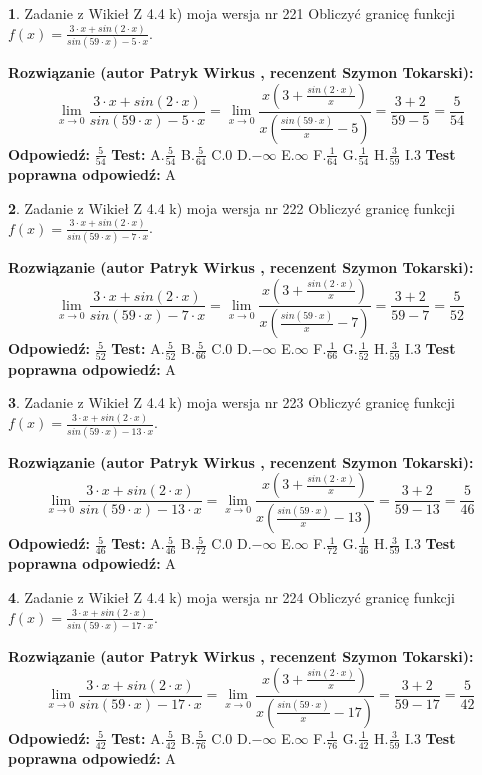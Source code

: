 \documentclass[12pt, a4paper]{article}
\theoremstyle{definition} %
\newtheorem{zad}{}
\newcommand{\zadStart}[1]{\begin{zad}#1\newline}
\newcommand{\zadStop}{\end{zad}}
\newcommand{\rozwStart}[2]{\noindent \textbf{Rozwiązanie (autor #1 , recenzent #2): }\newline}
\newcommand{\rozwStop}{\newline}
\newcommand{\odpStart}{\noindent \textbf{Odpowiedź:}\newline}
\newcommand{\odpStop}{\newline}
\newcommand{\testStart}{\noindent \textbf{Test:}\newline}
\newcommand{\testStop}{\newline}
\newcommand{\kluczStart}{\noindent \textbf{Test poprawna odpowiedź:}\newline}
\newcommand{\kluczStop}{\newline}
\begin{document}
\zadStart{Zadanie z Wikieł Z 4.4 k) moja wersja nr 221}
Obliczyć granicę funkcji $f(x)=\frac{3\cdot x +sin(2\cdot x)}{sin(59\cdot x) -5\cdot x}$.
\zadStop
\rozwStart{Patryk Wirkus}{Szymon Tokarski}
$$\lim\limits_{x\to 0}\frac{3\cdot x +sin(2\cdot x)}{sin(59\cdot x) -5\cdot x}
=\lim\limits_{x\to 0}\frac{x(3+\frac{sin(2\cdot x)}{x})}{x(\frac{sin(59\cdot x)}{x}-5)}
=\frac{3+2}{59-5} = \frac{5}{54}$$
\rozwStop
\odpStart
$\frac{5}{54}$
\odpStop
\testStart
A.$\frac{5}{54}$
B.$\frac{5}{64}$
C.$0$
D.$-\infty$
E.$\infty$
F.$\frac{1}{64}$
G.$\frac{1}{54}$
H.$\frac{3}{59}$
I.$3$
\testStop
\kluczStart
A
\kluczStop



\zadStart{Zadanie z Wikieł Z 4.4 k) moja wersja nr 222}
Obliczyć granicę funkcji $f(x)=\frac{3\cdot x +sin(2\cdot x)}{sin(59\cdot x) -7\cdot x}$.
\zadStop
\rozwStart{Patryk Wirkus}{Szymon Tokarski}
$$\lim\limits_{x\to 0}\frac{3\cdot x +sin(2\cdot x)}{sin(59\cdot x) -7\cdot x}
=\lim\limits_{x\to 0}\frac{x(3+\frac{sin(2\cdot x)}{x})}{x(\frac{sin(59\cdot x)}{x}-7)}
=\frac{3+2}{59-7} = \frac{5}{52}$$
\rozwStop
\odpStart
$\frac{5}{52}$
\odpStop
\testStart
A.$\frac{5}{52}$
B.$\frac{5}{66}$
C.$0$
D.$-\infty$
E.$\infty$
F.$\frac{1}{66}$
G.$\frac{1}{52}$
H.$\frac{3}{59}$
I.$3$
\testStop
\kluczStart
A
\kluczStop



\zadStart{Zadanie z Wikieł Z 4.4 k) moja wersja nr 223}
Obliczyć granicę funkcji $f(x)=\frac{3\cdot x +sin(2\cdot x)}{sin(59\cdot x) -13\cdot x}$.
\zadStop
\rozwStart{Patryk Wirkus}{Szymon Tokarski}
$$\lim\limits_{x\to 0}\frac{3\cdot x +sin(2\cdot x)}{sin(59\cdot x) -13\cdot x}
=\lim\limits_{x\to 0}\frac{x(3+\frac{sin(2\cdot x)}{x})}{x(\frac{sin(59\cdot x)}{x}-13)}
=\frac{3+2}{59-13} = \frac{5}{46}$$
\rozwStop
\odpStart
$\frac{5}{46}$
\odpStop
\testStart
A.$\frac{5}{46}$
B.$\frac{5}{72}$
C.$0$
D.$-\infty$
E.$\infty$
F.$\frac{1}{72}$
G.$\frac{1}{46}$
H.$\frac{3}{59}$
I.$3$
\testStop
\kluczStart
A
\kluczStop



\zadStart{Zadanie z Wikieł Z 4.4 k) moja wersja nr 224}
Obliczyć granicę funkcji $f(x)=\frac{3\cdot x +sin(2\cdot x)}{sin(59\cdot x) -17\cdot x}$.
\zadStop
\rozwStart{Patryk Wirkus}{Szymon Tokarski}
$$\lim\limits_{x\to 0}\frac{3\cdot x +sin(2\cdot x)}{sin(59\cdot x) -17\cdot x}
=\lim\limits_{x\to 0}\frac{x(3+\frac{sin(2\cdot x)}{x})}{x(\frac{sin(59\cdot x)}{x}-17)}
=\frac{3+2}{59-17} = \frac{5}{42}$$
\rozwStop
\odpStart
$\frac{5}{42}$
\odpStop
\testStart
A.$\frac{5}{42}$
B.$\frac{5}{76}$
C.$0$
D.$-\infty$
E.$\infty$
F.$\frac{1}{76}$
G.$\frac{1}{42}$
H.$\frac{3}{59}$
I.$3$
\testStop
\kluczStart
A
\kluczStop
\end{document}
